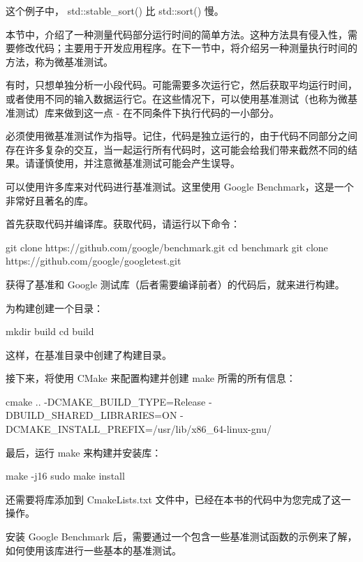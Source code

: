 这个例子中， std::stable\_sort() 比 std::sort() 慢。

本节中，介绍了一种测量代码部分运行时间的简单方法。这种方法具有侵入性，需要修改代码；主要用于开发应用程序。在下一节中，将介绍另一种测量执行时间的方法，称为微基准测试。


有时，只想单独分析一小段代码。可能需要多次运行它，然后获取平均运行时间，或者使用不同的输入数据运行它。在这些情况下，可以使用基准测试（也称为微基准测试）库来做到这一点 - 在不同条件下执行代码的一小部分。

必须使用微基准测试作为指导。记住，代码是独立运行的，由于代码不同部分之间存在许多复杂的交互，当一起运行所有代码时，这可能会给我们带来截然不同的结果。请谨慎使用，并注意微基准测试可能会产生误导。

可以使用许多库来对代码进行基准测试。这里使用 Google Benchmark，这是一个非常好且著名的库。

首先获取代码并编译库。获取代码，请运行以下命令：

\begin{shell}
git clone https://github.com/google/benchmark.git
cd benchmark
git clone https://github.com/google/googletest.git
\end{shell}

获得了基准和 Google 测试库（后者需要编译前者）的代码后，就来进行构建。

为构建创建一个目录：

\begin{shell}
mkdir build
cd build
\end{shell}

这样，在基准目录中创建了构建目录。

接下来，将使用 CMake 来配置构建并创建 make 所需的所有信息：

\begin{shell}
cmake .. -DCMAKE_BUILD_TYPE=Release -DBUILD_SHARED_LIBRARIES=ON -DCMAKE_INSTALL_PREFIX=/usr/lib/x86_64-linux-gnu/
\end{shell}

最后，运行 make 来构建并安装库：

\begin{shell}
make -j16
sudo make install
\end{shell}

还需要将库添加到 CmakeLists.txt 文件中，已经在本书的代码中为您完成了这一操作。

安装 Google Benchmark 后，需要通过一个包含一些基准测试函数的示例来了解，如何使用该库进行一些基本的基准测试。

